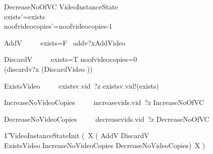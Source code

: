 \documentclass{article}
\begin{document}
\begin{schema}{DecreaseNoOfVC}
   \Delta VideoInstanceState \\
    \where
	exists'=exists\\
	noofvideocopies'=noofvideocopies-1\\
\end{schema}

\begin{circusaction}
     AddV ~~\circdef~~ \lcircguard exists=F \rcircguard  \circguard\ addv?x\then \lschexpract AddVideo \rschexpract \\
\end{circusaction}

\begin{circusaction}
     DiscardV ~~\circdef~~ \lcircguard exists=T \land noofvideocopies=0 \rcircguard  \circguard\\
     					(discardv?x \then (\lschexpract DiscardVideo \rschexpract)) \\
\end{circusaction}

\begin{circusaction}
     ExistsVideo ~~\circdef~~ existsv.vid~?z \then existsv.vid!(exists) \then \Skip \\
\end{circusaction}

\begin{circusaction}
     IncreaseNoVideoCopies ~~\circdef~~ increasevids.vid~?z \then \lschexpract IncreaseNoOfVC \rschexpract \\
\end{circusaction}

\begin{circusaction}
     DecreaseNoVideoCopies ~~\circdef~~ decreasevids.vid~?z \then \lschexpract DecreaseNoOfVC \rschexpract \\
\end{circusaction}

\begin{circusaction}
   \t1 \circspot \lschexpract VideoInstanceStateInit \rschexpract \circseq  (\circmu\ X \circspot (
   					AddV
					\extchoice
					DiscardV\\
					\extchoice
					ExistsVideo
					\extchoice
					IncreaseNoVideoCopies
					\extchoice
					DecreaseNoVideoCopies)\
					\circseq X )
\end{circusaction}

\begin{circus}
\circend
\end{circus}
\end{document}
